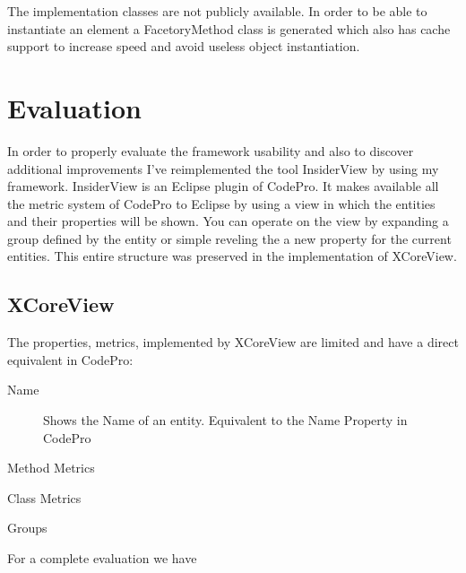 	The implementation classes are not publicly available.
In order to be able to instantiate an element a FacetoryMethod class is
generated which also has cache support to increase speed and avoid useless
object instantiation.
	
\section {Evaluation}
		In order to properly evaluate the framework usability and also to discover 
additional improvements I've reimplemented the tool InsiderView by using my
framework. InsiderView is an Eclipse plugin of CodePro. It makes available all
the metric system of CodePro to Eclipse by using a view in which the entities
and their properties will be shown. You can operate on the view by expanding a group
defined by the entity or simple reveling the a new property for the current
entities.
		This entire structure was preserved in the implementation of XCoreView.

\subsection {XCoreView}

		The properties, metrics, implemented by XCoreView are limited and have a
direct equivalent in CodePro:
		\begin{description}
		  \item[Name]  Shows the Name of an entity.  Equivalent to the Name
Property in CodePro
		  \item[Method Metrics]
		  		\begin{description}
		  			\item[]
		  		\end{description}
		  \item[Class Metrics]
		  		\begin{description}
		  			\item[]
		  		\end{description}
		  \item[Groups]
		  		\begin{description}
		  			\item[]
		  		\end{description}
		\end{description}
		
		For a complete evaluation we have



	